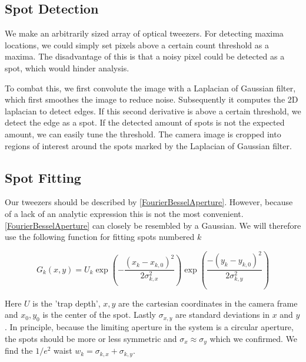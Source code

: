 \subsection{Spot Detection}

We make an arbitrarily sized array of optical tweezers. For detecting maxima locations, we could simply set pixels above a certain count threshold as a maxima. The disadvantage of this is that a noisy pixel could be detected as a spot, which would hinder analysis. 

To combat this, we first convolute the image with a Laplacian of Gaussian filter, which first smoothes the image to reduce noise. Subsequently it computes the 2D laplacian to detect edges. If this second derivative is above a certain threshold, we detect the edge as a spot. If the detected amount of spots is not the expected amount, we can easily tune the threshold. The camera image is cropped into regions of interest around the spots marked by the Laplacian of Gaussian filter. 

\subsection{Spot Fitting}

Our tweezers should be described by \cref{FourierBesselAperture}. However, because of a lack of an analytic expression this is not the most convenient. \cref{FourierBesselAperture} can closely be resembled by a Gaussian. We will therefore use the following function for fitting spots numbered $k$

\begin{equation}\label{2DGaussian}
    G_k(x,y) = U_k \exp{\left(-\frac{(x_k-x_{k,0})^2}{2\sigma_{k,x}^2}\right)}
    \exp{\left( \frac{-(y_k-y_{k,0})^2}{2\sigma_{k,y}^2} \right)}
\end{equation}

Here $U$ is the 'trap depth', $x,y$ are the cartesian coordinates in the camera frame and $x_0,y_0$ is the center of the spot. Lastly $\sigma_{x,y}$ are standard deviations in $x$ and $y$. In principle, because the limiting aperture in the system is a circular aperture, the spots should be more or less symmetric and $\sigma_x\approx \sigma_y$ which we confirmed. We find the $1/e^2$ waist $w_k=\sigma_{k,x}+\sigma_{k,y}$. 